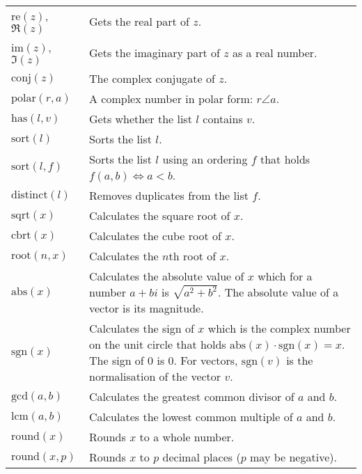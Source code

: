 \documentclass[10pt]{article}
\newcommand{\tabgap}{\vspace{3mm}\\}
\begin{document}
    \begin{longtable}{p{}p{}}
        $ \mathrm{re}(z) $, $ \Re(z) $             & Gets the real part of $ z $. \\
        $ \mathrm{im}(z) $, $ \Im(z) $             & Gets the imaginary part of $ z $ as a real number. \\
        $ \mathrm{conj}(z) $                       & The complex conjugate of $ z $. \\
        $ \mathrm{polar}(r, a) $                   & A complex number in polar form: $ r\angle a $. \tabgap
        $ \mathrm{has}(l, v) $                     & Gets whether the list $ l $ contains $ v $. \\
        $ \mathrm{sort}(l) $                       & Sorts the list $ l $. \\
        $ \mathrm{sort}(l, f) $                    & Sorts the list $ l $ using an ordering $ f $ that holds $ f(a, b) \iff a < b $. \\
        $ \mathrm{distinct}(l) $                   & Removes duplicates from the list $ f $. \tabgap
        $ \mathrm{sqrt}(x) $                       & Calculates the square root of $ x $. \\
        $ \mathrm{cbrt}(x) $                       & Calculates the cube root of $ x $. \\
        $ \mathrm{root}(n, x) $                    & Calculates the $ n $th root of $ x $. \tabgap
        $ \mathrm{abs}(x) $                        & Calculates the absolute value of $ x $ which for a number $ a + bi$ is $ \sqrt{a^2 + b^2} $. The absolute value of a vector is its magnitude. \\
        $ \mathrm{sgn}(x) $                        & Calculates the sign of $ x $ which is the complex number on the unit circle that holds $ \mathrm{abs}(x) \cdot \mathrm{sgn}(x) = x $. The sign of $ 0 $ is $ 0 $. For vectors, $ \mathrm{sgn}(v) $ is the normalisation of the vector $ v $. \tabgap
        $ \mathrm{gcd}(a, b) $                     & Calculates the greatest common divisor of $ a $ and $ b $. \\
        $ \mathrm{lcm}(a, b) $                     & Calculates the lowest common multiple of $ a $ and $ b $. \tabgap
        $ \mathrm{round}(x) $                      & Rounds $ x $ to a whole number. \\
        $ \mathrm{round}(x, p) $                   & Rounds $ x $ to $ p $ decimal places ($ p $ may be negative). \\

\end{longtable}
\end{document}
